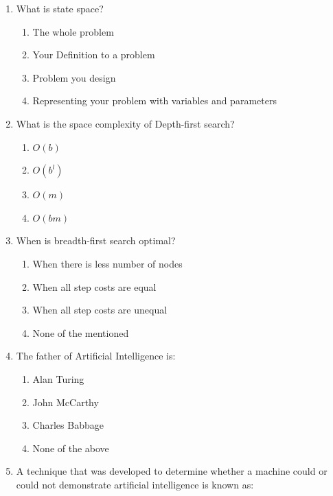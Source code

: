 \documentclass[11pt,a4paper]{article}
\begin{document}
\begin{enumerate}[label=(\roman*),leftmargin=*,itemsep=12pt]
  \item What is state space?
  
\begin{enumerate}[label=(\alph*),itemsep=2pt]
    \item The whole problem
    \item Your Definition to a problem
    \item Problem you design
    \item Representing your problem with variables and parameters
  \end{enumerate}
  
  \item What is the space complexity of Depth-first search?
  
\begin{enumerate}[label=(\alph*),itemsep=2pt]
    \item $O(b)$
    \item $O(b^l)$
    \item $O(m)$
    \item $O(bm)$
  \end{enumerate}
  
  \item When is breadth-first search optimal?
  
\begin{enumerate}[label=(\alph*),itemsep=2pt]
    \item When there is less number of nodes
    \item When all step costs are equal
    \item When all step costs are unequal
    \item None of the mentioned
  \end{enumerate}
  
  \item The father of Artificial Intelligence is:
  
\begin{enumerate}[label=(\alph*),itemsep=2pt]
    \item Alan Turing
    \item John McCarthy
    \item Charles Babbage
    \item None of the above
  \end{enumerate}
  
  \item A technique that was developed to determine whether a machine could or could not demonstrate artificial intelligence is known as:
  

\end{enumerate}
\end{document}
